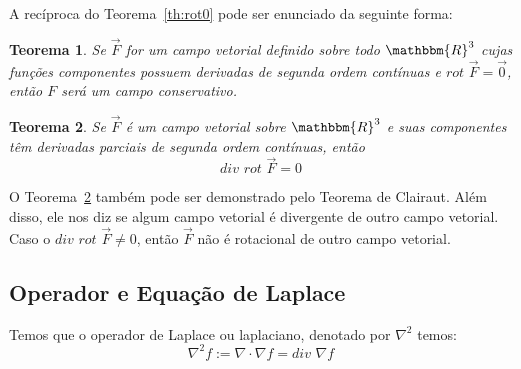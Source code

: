 \documentclass{article}
\newcommand{\REAL}{\mathbbm{R}}
\newcommand{\Rot}[0] {\textit{rot }}
\newcommand{\Div}[0] {\textit{div }}
\newtheorem{theorem}{Teorema}[section]
\begin{document}
        A recíproca do Teorema~\ref{th:rot0} pode ser enunciado da seguinte forma:
        \begin{theorem}
            Se $\vec{F}$ for um campo vetorial definido sobre todo $\REAL^3$ cujas funções componentes possuem derivadas
            de segunda ordem contínuas e $\Rot \vec{F} = \vec{0}$, então $F$ será um campo conservativo.
        \end{theorem}

        \begin{theorem}
            \label{th:divrot0}
            Se $\vec{F}$ é um campo vetorial sobre $\REAL^3$ e suas componentes têm derivadas parciais de segunda ordem
            contínuas, então
            \[
                \Div \Rot \vec{F} = 0
            \]
        \end{theorem}

        O Teorema~\ref{th:divrot0} também pode ser demonstrado pelo Teorema de Clairaut. Além disso, ele nos diz se algum campo
        vetorial é divergente de outro campo vetorial. Caso o $\Div \Rot \vec{F} \neq 0$, então $\vec{F}$ não é rotacional de outro
        campo vetorial.

        \subsection{Operador e Equação de Laplace}
            Temos que o operador de Laplace ou laplaciano, denotado por $\nabla^2$ temos:
            \[
                \nabla^2 f := \nabla \cdot \nabla f = \Div \nabla f
            \]
\end{document}
